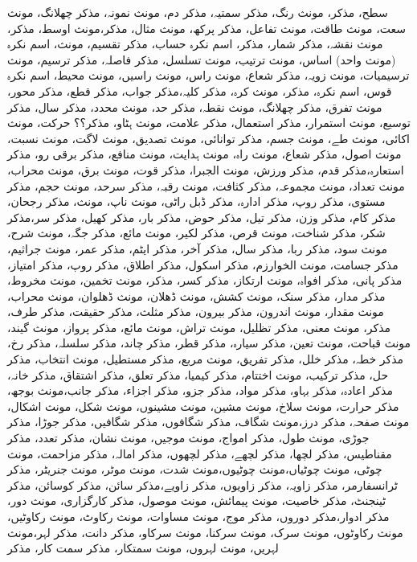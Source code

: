 سطح، مذکر، مونث
رنگ، مذکر
سمتیہ، مذکر
دم، مونث
نمونہ، مذکر
چھلانگ، مونث
سعت، مونث
طاقت، مونث
تفاعل، مذکر
پرکھ، مونث
مثال، مذکر،مونث
اوسط، مذکر، مونث
نقشہ، مذکر
شمار، مذکر، اسم نکرہ
حساب، مذکر
تقسیم، مونث، اسم نکرہ (مونث واحد)
اساس، مونث
ترتیب، مونث
تسلسل، مذکر
فاصلہ، مذکر
ترسیم، مونث
ترسیمیات، مونث
زویہ، مذکر
شعاع، مونث
راس، مونث
راسیں، مونث
محیط، اسم نکرہ
قوس، اسم نکرہ، مذکر، مونث
کرہ، مذکر
کلیہ،مذکر
جواب، مذکر
قطع، مذکر
محور، مونث
تفرق، مذکر
چھلانگ، مونث
نقطہ، مذکر
حد، مونث
محدد، مذکر
سال، مذکر
توسیع، مونث
استمرار، مذکر
استعمال، مذکر
علامت، مونث
ہٹاو، مذکر؟؟
حرکت، مونث
اکائی، مونث
طے، مونث
جسم، مذکر
توانائی، مونث
تصدیق، مونث
لاگت، مونث
نسبت، مونث
اصول، مذکر
شعاع، مونث
راہ، مونث
ہدایت، مونث
منافع، مذکر
برقی رو، مذکر
استعارہ،مذکر
قدم، مذکر
ورزش، مونث
الجبرا، مذکر
قوت، مونث
برق، مونث
محراب، مونث
تعداد، مونث
مجموعہ، مذکر
کثافت، مونث
رقبہ، مذکر
سرحد، مونث
حجم، مذکر
مستوی، مذکر
روپ، مذکر
ادارہ، مذکر
ڈبل راٹی، مونث
ناپ، مونث، مذکر
رجحان، مذکر
کام، مذکر
وزن، مذکر
تیل، مذکر
حوض، مذکر
بار، مذکر
کھیل، مذکر
سر،مذکر
شکر، مذکر
شناخت، مونث
 قرص، مذکر
لکیر، مونث
مائع، مذکر
جگہ، مونث
شرح، مونث
سود، مذکر
ربا، مذکر
سال، مذکر
آخر، مذکر
ایٹم، مذکر
عمر، مونث
جراثیم، مذکر
جسامت، مونث
الخوارزم، مذکر
اسکول، مذکر
اطلاق، مذکر
روپ، مذکر
امتیاز، مذکر
پانی، مذکر
افواہ، مونث
ارتکاز، مذکر
کسر، مذکر، مونث
تخمین، مونث
مخروط، مذکر
مدار، مذکر
سنک، مونث
کشش، مونث
ڈھلان، مونث
ڈھلوان، مونث
محراب، مونث
مقدار، مونث
اندرون، مذکر
بیرون، مذکر
مثلث، مذکر
حقیقت، مذکر
طرف، مذکر، مونث
معنی، مذکر
تظلیل، مونث
تراش، مونث
مائع، مذکر
پرواز، مونث
گیند، مونث
قباحت، مونث
تعین، مذکر
سیارہ، مذکر
قطر، مذکر
چاند، مذکر
سلسلہ، مذکر
رخ، مذکر
خطہ، مذکر
خلل، مذکر
تفریق، مونث
مربع، مذکر
مستطیل، مونث
انتخاب، مذکر
حل، مذکر
ترکیب، مونث
اختتام، مذکر
کیمیا، مذکر
تعلق، مذکر
اشتقاق، مذکر
خانہ، مذکر
اعادہ، مذکر
بہاو، مذکر
مواد، مذکر
جزو، مذکر
اجزاء، مذکر
جانب،مونث
بوجھ، مذکر
حرارت، مونث
سلاخ، مونث
مشین، مونث
مشینوں، مونث
شکل، مونث
اشکال، مونث
صفحہ، مذکر
درز،مونث
شگاف، مذکر
شگافوں، مذکر
شگافیں، مذکر
جوڑا، مذکر
جوڑی، مونث
طول، مذکر
امواج، مونث
موجیں، مونث
نشان، مذکر
تعدد، مذکر
مقناطیس، مذکر
لچھا، مذکر
لچھے، مذکر
لچھوں، مذکر
امالہ، مذکر
مزاحمت، مونث
چوٹی، مونث
چوٹیاں،مونث
چوٹیوں،مونث
شدت، مونث
موٹر، مونث
جنریٹر، مذکر
ٹرانسفارمر، مذکر
زاویہ، مذکر
زاویوں، مذکر
زاویے،مذکر
سائن، مذکر
کوسائن، مذکر
ٹینجنٹ، مذکر
خاصیت، مونث
پیمائش، مونث
موصول، مذکر
کارگزاری، مونث
دور، مذکر
ادوار،مذکر
دوروں، مذکر
موج، مونث
مساوات، مونث
رکاوٹ، مونث
رکاوٹیں، مونث
رکاوٹوں، مونث
سرک، مونث
سرکنا، مونث
سرکاو، مذکر
دانت، مذکر
لہر،مونث
لہریں، مونث
لہروں، مونث
سمتکار، مذکر
سمت کار، مذکر

